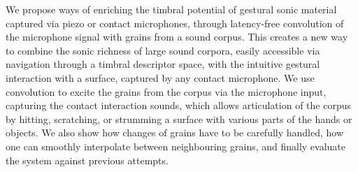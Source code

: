 We propose ways of enriching the timbral potential of gestural sonic material captured via piezo or contact microphones, through latency-free convolution of the microphone signal with grains from a sound corpus.
%
This creates a new way to combine the sonic richness of large sound corpora, easily accessible via navigation through a timbral descriptor space, with the intuitive gestural interaction with a surface, captured by any contact microphone.
%
We use convolution to excite the grains from the corpus via the microphone input, capturing the contact interaction sounds, which allows articulation of the corpus by hitting, scratching, or strumming a surface with various parts of the hands or objects.
%
We also show how changes of grains have to be carefully handled, how one can smoothly interpolate between neighbouring grains, and finally evaluate the system against previous attempts.
